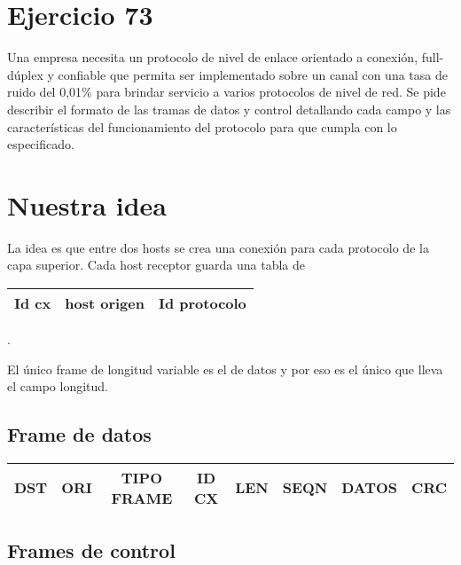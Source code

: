 \documentclass[a4paper,10pt]{article}
\begin{document}
\section*{Ejercicio 73}
   Una empresa necesita un protocolo de nivel de enlace orientado a conexión, full-dúplex y confiable que 
   permita ser implementado sobre un canal con una tasa de ruido del 0,01\% para brindar servicio a varios 
   protocolos de nivel de red. Se pide describir el formato de las tramas de datos y control detallando 
   cada campo y las características del funcionamiento del protocolo para que cumpla con lo especificado.

\section*{Nuestra idea}

La idea es que entre dos hosts se crea una conexión para cada protocolo de la capa superior.  Cada host receptor guarda una tabla de 
\begin{tabular}{|c|c|c|}\hline
Id cx &host origen &Id protocolo\\\hline
\end{tabular}.

El único frame de longitud variable es el de datos y por eso es el único que lleva el campo longitud.

\subsection*{Frame de datos}

\begin{tabular}{|c|c|c|c|c|c|c|c|}\hline
	DST & ORI & TIPO FRAME & ID CX & LEN & SEQN & DATOS & CRC \\ \hline
\end{tabular}

\subsection*{Frames de control}
\end{document}
